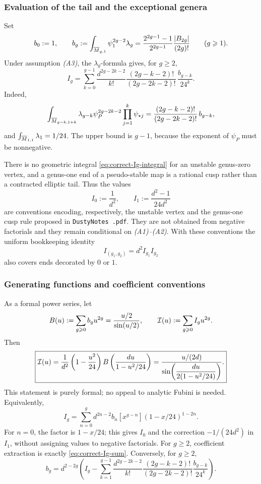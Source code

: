 \documentclass[12pt]{memoir}
\begin{document}
\subsubsection{Evaluation of the tail and the exceptional genera}

Set
\[
 b_0:=1,\qquad
 b_g:=\int_{\overline M_{g,1}}\psi_1^{2g-2}\lambda_g
 =\frac{2^{2g-1}-1}{2^{2g-1}}\frac{|B_{2g}|}{(2g)!}
 \qquad(g\geqslant1).
\]
Under assumption \emph{(A3)}, the \(\lambda_g\)-formula gives, for
\(g\geq2\),
\begin{equation}\label{eq:correct-Ig-sum}
 \boxed{
 I_g=\sum_{k=0}^{g-1}
 \frac{d^{2g-2k-2}}{k!}
 \frac{(2g-k-2)!}{(2g-2k-2)!}\,
 \frac{b_{g-k}}{24^k}.}
\end{equation}
Indeed,
\[
 \int_{\overline M_{g-k,1+k}}
 \lambda_{g-k}\psi_P^{2g-2k-2}\prod_{j=1}^k\psi_{\star j}
 =\frac{(2g-k-2)!}{(2g-2k-2)!}\,b_{g-k},
\]
and \(\int_{\overline M_{1,1}}\lambda_1=1/24\).  The upper bound is
\(g-1\), because the exponent of \(\psi_P\) must be nonnegative.

There is no geometric integral \eqref{eq:correct-Ig-integral} for an
unstable genus-zero vertex, and a genus-one end of a pseudo-stable map is a
rational cusp rather than a contracted elliptic tail.  Thus the values
\[
 I_0:=\frac1{d^2},\qquad
 I_1:=\frac{d^2-1}{24d^2}
\]
are conventions encoding, respectively, the unstable vertex and the
genus-one cusp rule proposed in \texttt{DustyNotes .pdf}.  They are not obtained
from negative factorials and they remain conditional on \emph{(A1)--(A2)}.
With these conventions the uniform bookkeeping identity
\[
 I_{(g_1,g_2)}=d^2I_{g_1}I_{g_2}
\]
also covers ends decorated by \(0\) or \(1\).

\subsubsection{Generating functions and coefficient conventions}

As a formal power series, let
\[
 B(u):=\sum_{g\geqslant0}b_gu^{2g}=\frac{u/2}{\sin(u/2)},
 \qquad
 \mathcal{I}(u):=\sum_{g\geqslant0}I_gu^{2g}.
\]
Then
\begin{equation}\label{eq:correct-I-generating}
 \boxed{
 \mathcal{I}(u)=\frac1{d^2}\left(1-\frac{u^2}{24}\right)
 B\left(\frac{du}{1-u^2/24}\right)
 =\frac{u/(2d)}{\sin\!\left(\dfrac{du}{2(1-u^2/24)}\right)}.}
\end{equation}
This statement is purely formal; no appeal to analytic Fubini is needed.
Equivalently,
\[
 I_g=\sum_{n=0}^g d^{2n-2}b_n
 [x^{g-n}](1-x/24)^{1-2n}.
\]
For \(n=0\), the factor is \(1-x/24\); this gives \(I_0\) and the
correction \(-1/(24d^2)\) in \(I_1\), without assigning values to
negative factorials.  For \(g\geq2\), coefficient extraction is exactly
\eqref{eq:correct-Ig-sum}.  Conversely, for \(g\geq2\),
\[
 b_g=d^{2-2g}\left(
 I_g-\sum_{k=1}^{g-1}
 \frac{d^{2g-2k-2}}{k!}
 \frac{(2g-k-2)!}{(2g-2k-2)!}\frac{b_{g-k}}{24^k}
 \right).
\]
\end{document}
